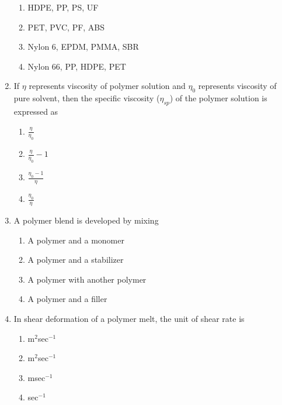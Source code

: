 \documentclass[a4paper,10pt]{article}
\begin{document}
\begin{enumerate}
\begin{multicols}{2}
\begin{enumerate}
\item HDPE, PP, PS, UF
\item PET, PVC, PF, ABS
\item Nylon 6, EPDM, PMMA, SBR
\item Nylon 66, PP, HDPE, PET
\end{enumerate}
\end{multicols}

\item If $\eta$ represents viscosity of polymer solution and $\eta_0$ represents viscosity of pure solvent, then the specific viscosity ($\eta_{sp}$) of the polymer solution is expressed as
\begin{flushright}
\end{flushright}

\begin{multicols}{4}
\begin{enumerate}
\item $\frac{\eta}{\eta_0}$
\item $\frac{\eta}{\eta_0} - 1$
\item $\frac{\eta_0-1}{\eta}$
\item $\frac{\eta_0}{\eta}$
\end{enumerate}
\end{multicols}

\item A polymer blend is developed by mixing
\hfill{}

\begin{multicols}{2}
\begin{enumerate}
\item A polymer and a monomer
\item A polymer and a stabilizer
\item A polymer with another polymer
\item A polymer and a filler
\end{enumerate}
\end{multicols}

\item In shear deformation of a polymer melt, the unit of shear rate is
\hfill{}

\begin{multicols}{4}
\begin{enumerate}
\item m$^2$sec$^{-1}$
\item m$^2$sec$^{-1}$
\item msec$^{-1}$
\item sec$^{-1}$
\end{enumerate}
\end{multicols}


\end{enumerate}
\end{document}
